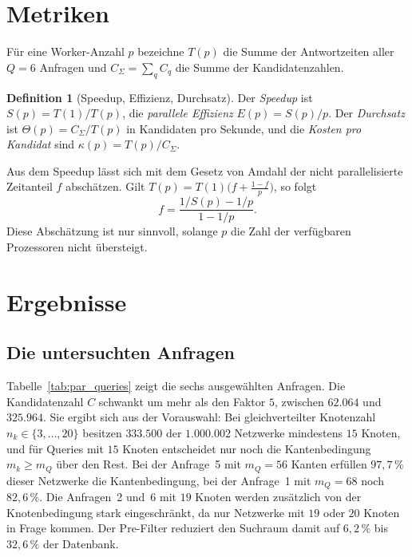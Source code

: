 \documentclass[a4paper,12pt, twoside]{report}
\theoremstyle{definition}
\newtheorem{definition}{Definition}
\begin{document}
\section{Metriken}

Für eine Worker-Anzahl $p$ bezeichne $T(p)$ die Summe der Antwortzeiten aller $Q=6$ Anfragen und $C_{\Sigma}=\sum_q C_q$ die Summe der Kandidatenzahlen.

\begin{definition}[Speedup, Effizienz, Durchsatz]
	\label{def:par_metriken}
	Der \emph{Speedup} ist $S(p)=T(1)/T(p)$, die \emph{parallele Effizienz} $E(p)=S(p)/p$. Der \emph{Durchsatz} ist $\Theta(p)=C_\Sigma/T(p)$ in Kandidaten pro Sekunde, und die \emph{Kosten pro Kandidat} sind $\kappa(p)=T(p)/C_\Sigma$.
\end{definition}

Aus dem Speedup lässt sich mit dem Gesetz von Amdahl der nicht parallelisierte Zeitanteil $f$ abschätzen. Gilt $T(p)=T(1)\bigl(f+\tfrac{1-f}{p}\bigr)$, so folgt
\[
f=\frac{1/S(p)-1/p}{1-1/p}.
\]
Diese Abschätzung ist nur sinnvoll, solange $p$ die Zahl der verfügbaren Prozessoren nicht übersteigt.

\section{Ergebnisse}

\subsection{Die untersuchten Anfragen}

Tabelle~\ref{tab:par_queries} zeigt die sechs ausgewählten Anfragen. Die Kandidatenzahl $C$ schwankt um mehr als den Faktor $5$, zwischen $62.064$ und $325.964$. Sie ergibt sich aus der Vorauswahl: Bei gleichverteilter Knotenzahl $n_k\in\{3,\dots,20\}$ besitzen $333.500$ der $1.000.002$ Netzwerke mindestens $15$ Knoten, und für Queries mit $15$ Knoten entscheidet nur noch die Kantenbedingung $m_k\ge m_Q$ über den Rest. Bei der Anfrage~5 mit $m_Q=56$ Kanten erfüllen $97{,}7\,\%$ dieser Netzwerke die Kantenbedingung, bei der Anfrage~1 mit $m_Q=68$ noch $82{,}6\,\%$. Die Anfragen~2 und~6 mit $19$ Knoten werden zusätzlich von der Knotenbedingung stark eingeschränkt, da nur Netzwerke mit $19$ oder $20$ Knoten in Frage kommen. Der Pre-Filter reduziert den Suchraum damit auf $6{,}2\,\%$ bis $32{,}6\,\%$ der Datenbank.
\end{document}
